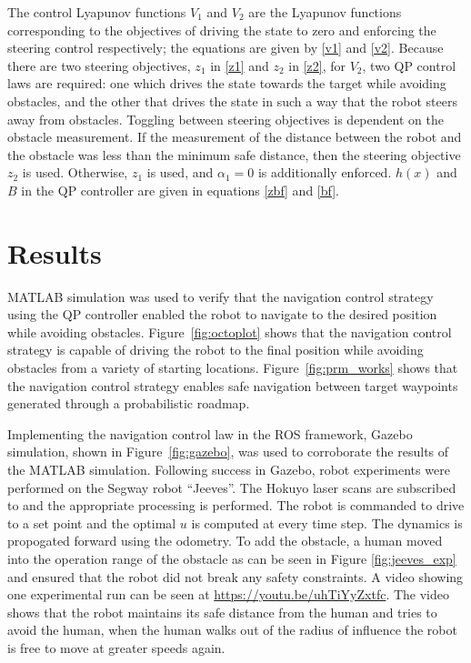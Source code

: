 \documentclass[conference]{IEEEtran}
\begin{document}
The control Lyapunov functions $V_1$ and $V_2$ are the Lyapunov functions corresponding to the objectives of driving the state to zero and enforcing the steering control respectively; the equations are given by \eqref{v1} and \eqref{v2}. Because there are two steering objectives, $z_1$ in \eqref{z1} and $z_2$ in \eqref{z2}, for $V_2$, two QP control laws are required: one which drives the state towards the target while avoiding obstacles, and the other that drives the state in such a way that the robot steers away from obstacles. Toggling between steering objectives is dependent on the obstacle measurement. If the measurement of the distance between the robot and the obstacle was less than the minimum safe distance, then the steering objective $z_2$ is used. Otherwise, $z_1$ is used, and $\alpha_1=0$ is additionally enforced. $h(x)$ and $B$ in the QP controller are given in equations \eqref{zbf} and \eqref{bf}. 

\section{Results}
MATLAB simulation was used to verify that the navigation control strategy using the QP controller enabled the robot to navigate to the desired position while avoiding obstacles. Figure~\ref{fig:octoplot} shows that the navigation control strategy is capable of driving the robot to the final position while avoiding obstacles from a variety of starting locations. Figure~\ref{fig:prm_works} shows that the navigation control strategy enables safe navigation between target waypoints generated through a probabilistic roadmap.

Implementing the navigation control law in the ROS framework, Gazebo simulation, shown in Figure~\ref{fig:gazebo}, was used to corroborate the results of the MATLAB simulation. Following success in Gazebo, robot experiments were performed on the Segway robot ``Jeeves''. The Hokuyo laser scans are subscribed to and the appropriate processing is performed. The robot is commanded to drive to a set point and the optimal $u$ is computed at every time step. The dynamics is propogated forward using the odometry. To add the obstacle, a human moved into the operation range of the obstacle as can be seen in Figure \ref{fig:jeeves_exp} and ensured that the robot did not break any safety constraints. A video showing one experimental run can be seen at \url {https://youtu.be/uhTiYyZxtfc}. The video shows that the robot maintains its safe distance from the human and tries to avoid the human, when the human walks out of the radius of influence the robot is free to move at greater speeds again.
\end{document}

